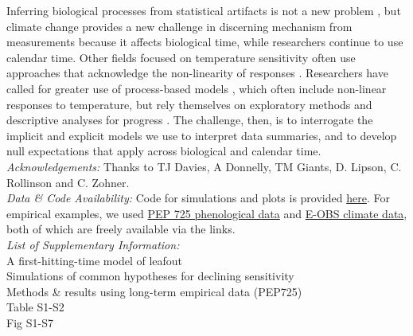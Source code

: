 \documentclass[11pt,letter]{article}
\begin{document}
Inferring biological processes from statistical artifacts is not a new problem \citep[e.g.,][]{nee2005}, but climate change provides a new challenge in discerning mechanism from measurements because it affects biological time, while researchers continue to use calendar time. Other fields focused on temperature sensitivity often use approaches that acknowledge the non-linearity of responses \citep[e.g.,][]{yuste2004}. Researchers have called for greater use of process-based models \citep{keenan2019}, which often include non-linear responses to temperature, but rely themselves on exploratory methods and descriptive analyses for progress \citep{chuine2016}. The challenge, then, is to interrogate the implicit and explicit models we use to interpret data summaries, and to develop null expectations that apply across biological and calendar time. \\



\vspace{5ex}
\emph{Acknowledgements:} Thanks to TJ Davies, A Donnelly, TM Giants, D. Lipson, C. Rollinson and C. Zohner. \\

\emph{Data \& Code Availability:} Code for simulations and plots is provided \href{https://github.com/temporalecologylab/labgit/tree/master/projects/decsenspost}{here}. For empirical examples, we used \href{http://www.pep725.eu/data.php}{PEP 725 phenological data} and \href{https://surfobs.climate.copernicus.eu/dataaccess/access_eobs.php}{E-OBS climate data}, both of which are freely available via the links.\\

\emph{List of Supplementary Information:}\\
A first-hitting-time model of leafout\\
Simulations of common hypotheses for declining sensitivity\\
Methods \& results using long-term empirical data (PEP725)\\
Table S1-S2\\
Fig S1-S7\\
\end{document}
